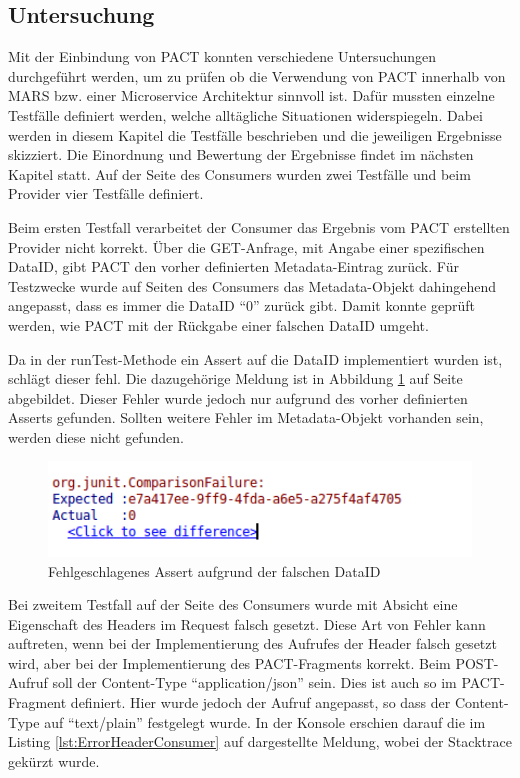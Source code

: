 \documentclass{llncs}
\begin{document}
\subsection{Untersuchung}
Mit der Einbindung von PACT konnten verschiedene Untersuchungen durchgeführt werden, um zu prüfen ob die Verwendung von PACT innerhalb von MARS bzw. einer Microservice Architektur sinnvoll ist. Dafür mussten einzelne Testfälle definiert werden, welche alltägliche Situationen widerspiegeln. Dabei werden in diesem Kapitel die Testfälle beschrieben und die jeweiligen Ergebnisse skizziert. Die Einordnung und Bewertung der Ergebnisse findet im nächsten Kapitel statt. Auf der Seite des Consumers wurden zwei Testfälle und beim Provider vier Testfälle definiert.

Beim ersten Testfall verarbeitet der Consumer das Ergebnis vom PACT erstellten Provider nicht korrekt. Über die GET-Anfrage, mit Angabe einer spezifischen DataID, gibt PACT den vorher definierten Metadata-Eintrag zurück. Für Testzwecke wurde auf Seiten des Consumers das Metadata-Objekt dahingehend angepasst, dass es immer die DataID \enquote{0} zurück gibt. Damit konnte geprüft werden, wie PACT mit der Rückgabe einer falschen DataID umgeht.

Da in der runTest-Methode ein Assert auf die DataID implementiert wurden ist, schlägt dieser fehl. Die dazugehörige Meldung ist in Abbildung \ref{fig:ErrorConsumerGet} auf Seite \pageref{fig:ErrorConsumerGet} abgebildet. Dieser Fehler wurde jedoch nur aufgrund des vorher definierten Asserts gefunden. Sollten weitere Fehler im Metadata-Objekt vorhanden sein, werden diese nicht gefunden.

\begin{figure}[htbp]
  \centering
      \includegraphics[width=1\textwidth]{./Images/Error_Consumer-GET}
    \caption{Fehlgeschlagenes Assert aufgrund der falschen DataID}
    \label{fig:ErrorConsumerGet}
\end{figure}

Bei zweitem Testfall auf der Seite des Consumers wurde mit Absicht eine Eigenschaft des Headers im Request falsch gesetzt. Diese Art von Fehler kann auftreten, wenn bei der Implementierung des Aufrufes der Header falsch gesetzt wird, aber bei der Implementierung des PACT-Fragments korrekt. Beim POST-Aufruf soll der Content-Type \enquote{application/json} sein. Dies ist auch so im PACT-Fragment definiert. Hier wurde jedoch der Aufruf angepasst, so dass der Content-Type auf \enquote{text/plain} festgelegt wurde. In der Konsole erschien darauf die im Listing \ref{lst:ErrorHeaderConsumer} auf \pageref{lst:ErrorHeaderConsumer} dargestellte Meldung, wobei der Stacktrace gekürzt wurde.
\end{document}
